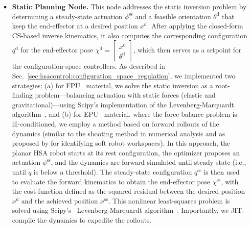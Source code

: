 \begin{itemize}
\begin{itemize}
        \item \textbf{Static Planning Node.} This node addresses the static inversion problem by determining a steady-state actuation $\phi^\mathrm{ss}$ and a feasible orientation $\theta^\mathrm{d}$ that keep the end-effector at a desired position $x^\mathrm{d}$. After applying the closed-form \gls{CS}-based inverse kinematics, it also computes the corresponding configuration $q^\mathrm{d}$ for the end-effector pose $\chi^\mathrm{d} = \begin{bmatrix} x^\mathrm{d}\\ \theta^\mathrm{d} \end{bmatrix}$, which then serves as a setpoint for the configuration-space controllers. As described in Sec.~\ref{sec:hsacontrol:configuration_space_regulation}, we implemented two strategies: (a) for FPU~\citep{carbon:fpu50} material, we solve the static inversion as a root-finding problem—balancing actuation with static forces (elastic and gravitational)—using Scipy’s implementation of the Levenberg-Marquardt algorithm~\citep{levenberg1944method, marquardt1963algorithm}, and (b) for EPU~\citep{carbon:epu40} material, where the force balance problem is ill-conditioned, we employ a method based on forward rollouts of the dynamics (similar to the shooting method in numerical analysis and as proposed by \citet{amehri2022workspace} for identifying soft robot workspaces). In this approach, the planar \gls{HSA} robot starts at its rest configuration, the optimizer proposes an actuation $\phi^\mathrm{ss}$, and the dynamics are forward-simulated until steady-state (i.e., until $\dot{q}$ is below a threshold). The steady-state configuration $q^\mathrm{ss}$ is then used to evaluate the forward kinematics to obtain the end-effector pose $\chi^\mathrm{ss}$, with the cost function defined as the squared residual between the desired position $x^\mathrm{d}$ and the achieved position $x^\mathrm{ss}$. This nonlinear least-squares problem is solved using Scipy’s~\citep{virtanen202scipy} Levenberg-Marquardt algorithm~\citep{levenberg1944method, marquardt1963algorithm}. Importantly, we \gls{JIT}-compile the dynamics to expedite the rollouts.
    \end{itemize}
\end{itemize}



